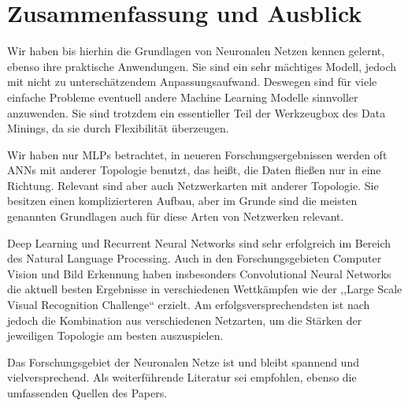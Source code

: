 \section{Zusammenfassung und Ausblick}
Wir haben bis hierhin die Grundlagen von Neuronalen Netzen kennen gelernt, ebenso ihre praktische Anwendungen. 
Sie sind ein sehr mächtiges Modell, jedoch mit nicht zu unterschätzendem Anpassungsaufwand. Deswegen sind für viele einfache Probleme eventuell andere Machine Learning Modelle sinnvoller anzuwenden. Sie sind trotzdem ein essentieller Teil der Werkzeugbox des Data Minings, da sie durch Flexibilität überzeugen. 

Wir haben nur MLPs betrachtet, in neueren Forschungsergebnissen werden oft ANNs mit anderer Topologie benutzt, das heißt, die Daten fließen nur in eine Richtung. Relevant sind aber auch Netzwerkarten mit anderer Topologie. Sie besitzen einen komplizierteren Aufbau, aber im Grunde sind die meisten genannten Grundlagen auch für diese Arten von Netzwerken relevant. 

Deep Learning und Recurrent Neural Networks sind sehr erfolgreich im Bereich des Natural Language Processing. Auch in den Forschungsgebieten Computer Vision und Bild Erkennung haben insbesonders Convolutional Neural Networks die aktuell besten Ergebnisse in verschiedenen Wettkämpfen wie der  ,,Large Scale Visual Recognition Challenge`` erzielt. Am erfolgsversprechendsten ist nach \cite{LeCun2015} jedoch die Kombination aus verschiedenen Netzarten, um die Stärken der jeweiligen Topologie am besten auszuspielen. 

Das Forschungsgebiet der Neuronalen Netze ist und bleibt spannend und vielversprechend. Als weiterführende Literatur sei \cite{LeCun2015} empfohlen, ebenso die umfassenden Quellen des Papers.



